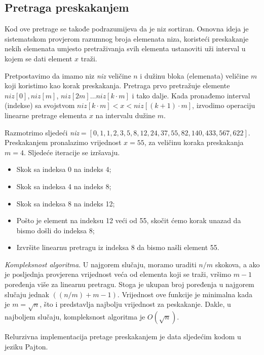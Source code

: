 \subsection{Pretraga preskakanjem}

Kod ove pretrage se takođe podrazumijeva da je niz sortiran.  Osnovna ideja je sistematskom provjerom razumnog broja elemenata niza,  koristeći preskakanje nekih elemenata umjesto pretraživanja svih elementa  ustanoviti uži interval u kojem se dati element $x$ traži.

Pretpostavimo da imamo niz \emph{niz} veličine $n$ i dužinu bloka (elemenata) veličine $m$ koji koristimo kao korak preskakanja. Pretraga prvo pretražuje elemente $niz[0], niz[m]$, $niz[2m] \ldots niz[k \cdot m]$ i tako dalje. Kada pronađemo interval (indekse) sa svojstvom $niz[k\cdot m] < x < niz[(k+1) \cdot m]$, izvodimo operaciju linearne pretrage elementa $x$ na intervalu dužine $m$.  %
 
 
 Razmotrimo sljedeći \emph{niz}$=[0, 1, 1, 2, 3, 5, 8, 12, 24, 37, 55, 82, 140, 433, 567, 622]$. Preskakanjem pronalazimo vrijednost $x=55$, za veličinu koraka preskakanja $m=4$. Sljedeće iteracije se izršavaju. 
 \begin{itemize}
 	\item  Skok sa indeksa 0 na indeks 4;
 	\item   Skok sa indeksa 4 na indeks 8;
 	\item   Skok sa indeksa 8 na indeks 12;
 	\item  Pošto je element na indeksu 12 veći od 55, skočit ćemo korak unazad da bismo došli do indeksa 8;
 	\item  Izvršite linearnu pretragu iz indeksa 8 da bismo našli element 55.
 \end{itemize}
 
 \textit{Kompleksnost algoritma}. U najgorem slučaju, moramo uraditi $n/m$ skokova, a ako je posljednja provjerena vrijednost veća od elementa koji se traži, vršimo $m-1$ poređenja više za linearnu pretragu. Stoga je ukupan broj poređenja u najgorem slučaju jednak $((n/m) + m-1)$. Vrijednost ove funkcije  je minimalna kada je $m = \sqrt{n}$, što i predstavlja najbolju vrijednost za peskakanje. Dakle, u najboljem slučaju, kompleksnost algoritma je $O(\sqrt{n})$. 
 
 
Relurzivna implementacija pretage preskakanjem  je data sljedećim kodom   u jeziku Pajton. 
 
